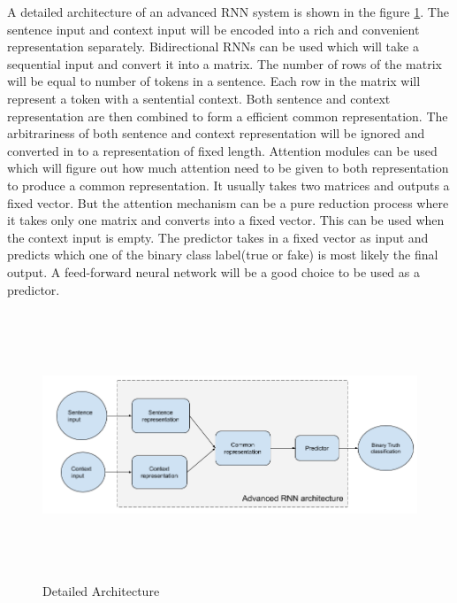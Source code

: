 \documentclass[a4paper, 11pt]{article}
\begin{document}
A detailed architecture of an advanced RNN system is shown in the figure \ref{fig:detailed_architecture}. The sentence input and context input will be encoded into a rich and convenient representation separately. Bidirectional RNNs can be used which will take a sequential input and convert it into a matrix. The number of rows of the matrix will be equal to number of tokens in a sentence. Each row in the matrix will represent a token with a sentential context. Both sentence and context representation are then combined to form a efficient common representation. The arbitrariness of both sentence and context representation will be ignored and converted in to a representation of fixed length. Attention modules can be used which will figure out how much attention need to be given to both representation to produce a common representation. It usually takes two matrices and outputs a fixed vector. But the attention mechanism can be a pure reduction process where it takes only one matrix and converts into a fixed vector. This can be used when the context input is empty. The predictor takes in a fixed vector as input and predicts which one of the binary class label(true or fake) is most likely the final output. A feed-forward neural network will be a good choice to be used as a predictor. 

\begin{figure}[htpb]
    \centering
    \includegraphics[width=\textwidth,height=8cm,keepaspectratio=true]
    {detailed-architecture-diagram.png}
    \caption{
        Detailed Architecture
    }
    \label{fig:detailed_architecture}
\end{figure}
\end{document}
